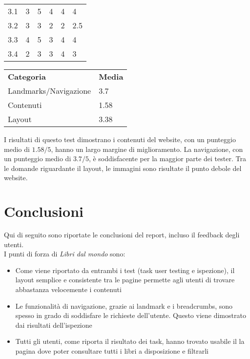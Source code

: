 \documentclass[12pt,a4paper,oneside]{report}
\begin{document}
{\begin{tabular}{p{2cm}p{2cm}p{2cm}p{2cm}p{2cm}l}
	3.1              & 3                     & 5                      & 4                     & 4                      & 4               \\
	3.2              & 3                     & 3                      & 2                     & 2                      & 2.5               \\
	3.3              & 4                     & 5                      & 3                     & 4                      & 4               \\
	3.4              & 2                     & 3                      & 3                     & 4                      & 3               \\
	\bottomrule
\end{tabular}

\begin{tabular}{p{5cm}l} 
	\toprule
	\textbf{Categoria}  & \textbf{Media}  \\
	Landmarks/Navigazione & 3.7 \\
	Contenuti & 1.58 \\
	Layout & 3.38 \\
	\bottomrule
\end{tabular}

}

\vspace{1cm}

I risultati di questo test dimostrano i contenuti del website, con un punteggio medio di $ 1.58/5 $, hanno un largo margine di miglioramento. La navigazione, con un punteggio medio di $ 3.7/5 $, è soddisfacente per la maggior parte dei tester. Tra le domande riguardante il layout, le immagini sono risultate il punto debole del website.

\chapter{Conclusioni}

Qui di seguito sono riportate le conclusioni del report, incluso il feedback degli utenti. \\

I punti di forza di \textit{Libri dal mondo} sono:

\begin{itemize}
	\item Come viene riportato da entrambi i test (task user testing e ispezione), il layout semplice e consistente tra le pagine permette agli utenti di trovare abbastanza velocemente i contenuti
	\item Le funzionalità di navigazione, grazie ai landmark e i breadcrumbs, sono spesso in grado di soddisfare le richieste dell'utente. Questo viene dimostrato dai risultati dell'ispezione
	\item Tutti gli utenti, come riporta il risultato dei task, hanno trovato usabile il la pagina dove poter consultare tutti i libri a disposizione e filtrarli
\end{itemize}
\end{document}
